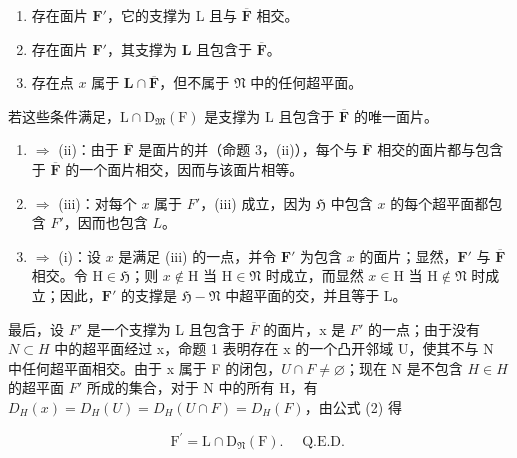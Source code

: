 \begin{enumerate}
\def\labelenumi{(\roman{enumi})}
\item
存在面片 \(\mathbf{F}'\)，它的支撑为 L 且与 \(\overline{\mathbf{F}}\) 相交。
\item
存在面片 \(\mathbf{F}'\)，其支撑为 \(\mathbf{L}\) 且包含于 \(\overline{\mathbf{F}}\)。
\item
存在点 \(x\) 属于 \(\mathbf{L} \cap \overline{\mathbf{F}}\)，但不属于 \(\mathfrak{N}\) 中的任何超平面。
\end{enumerate}

若这些条件满足，\(\mathrm{L} \cap \mathrm{D}_{\mathfrak{M}}(\mathrm{F})\) 是支撑为 \(\mathrm{L}\) 且包含于 \(\overline{\mathbf{F}}\) 的唯一面片。

\begin{enumerate}
\def\labelenumi{(\roman{enumi})}
\item
\(\Longrightarrow\) (ii)：由于 \(\overline{\mathbf{F}}\) 是面片的并（命题 3，(ii)），每个与 \(\overline{\mathbf{F}}\) 相交的面片都与包含于 \(\overline{\mathbf{F}}\) 的一个面片相交，因而与该面片相等。
\item
\(\Longrightarrow\) (iii)：对每个 \(x\) 属于 \(F'\)，(iii) 成立，因为 \(\mathfrak{H}\) 中包含 \(x\) 的每个超平面都包含 \(F'\)，因而也包含 \(L\)。
\item
\(\Longrightarrow\) (i)：设 \(x\) 是满足 (iii) 的一点，并令 \(\mathbf{F}'\) 为包含 \(x\) 的面片；显然，\(\mathbf{F}'\) 与 \(\overline{\mathbf{F}}\) 相交。令 \(\mathrm{H} \in \mathfrak{H}\)；则 \(x \notin \mathrm{H}\) 当 \(\mathrm{H} \in \mathfrak{N}\) 时成立，而显然 \(x \in \mathrm{H}\) 当 \(\mathrm{H} \notin \mathfrak{N}\) 时成立；因此，\(\mathbf{F}'\) 的支撑是 \(\mathfrak{H} - \mathfrak{N}\) 中超平面的交，并且等于 \(\mathrm{L}\)。
\end{enumerate}

最后，设 \(F'\) 是一个支撑为 L 且包含于 \(\overline{F}\) 的面片，x 是 \(F'\) 的一点；由于没有 \(N \subset H\) 中的超平面经过 x，命题 1 表明存在 x 的一个凸开邻域 U，使其不与 N 中任何超平面相交。由于 x 属于 F 的闭包，\(U \cap F \neq \varnothing\)；现在 N 是不包含 \(H \in H\) 的超平面 \(F'\) 所成的集合，对于 N 中的所有 H，有 \(D_{H}(x) = D_{H}(U) = D_{H}(U \cap F) = D_{H}(F)\)，由公式 (2) 得

\[
\mathrm{F} ^ {\prime} = \mathrm{L} \cap \mathrm{D} _ {\mathfrak {N}} (\mathrm{F}). \quad \text { Q.E.D. }
\]

